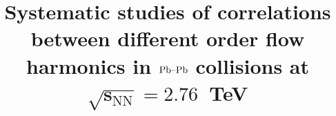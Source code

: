 \documentclass[ALICE,manyauthors]{cernphprep}
\begin{document}
%
%

\newcommand{\PbPb}{\textnormal{Pb--Pb}}
\newcommand{\AuAu}{\textnormal{Au--Au}}
\newcommand{\pp}{\ensuremath{\mbox{p}\mbox{p}}}
\newcommand{\tn}[1]{\textnormal{#1}}
\newcommand{\snn}{\ensuremath{\sqrt{s_\tn{NN}}}}
\newcommand{\pt}{\ensuremath{p_\tn{T}}}\newcommand{\pT}{\pt}
\newcommand{\CKBNOTE}[1]{{\bf CKB:  #1}} 
\renewcommand{\CKBNOTE}[1]{}  %

\newcommand{\RHNOTE}[1]{{\bf RH:  #1}} 
\renewcommand{\RHNOTE}[1]{}  %

\begin{titlepage}
%
%
%
\title{Systematic studies of correlations between different order flow harmonics in $\PbPb$ collisions at $\mathbf{\sqrt{s_\mathrm{NN}} = 2.76}$~TeV}

%
%
\begin{abstract}


\end{abstract}
\end{titlepage}
\end{document}
